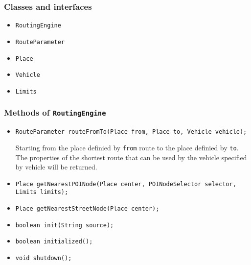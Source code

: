 \subsubsection{Classes and interfaces}

\begin{itemize}

	\item \texttt{RoutingEngine}
	\item \texttt{RouteParameter}
	\item \texttt{Place}
	\item \texttt{Vehicle}
	\item \texttt{Limits}

\end{itemize}

\subsubsection{Methods of \texttt{RoutingEngine}}

\begin{itemize}
	
	\item \texttt{RouteParameter routeFromTo(Place from, Place to, Vehicle vehicle);}\newline
	
	Starting from the place definied by \texttt{from} route to the place definied by \texttt{to}. The properties of the shortest route that can be used by the vehicle specified by vehicle will be returned.
	
	\item \texttt{Place getNearestPOINode(Place center, POINodeSelector selector, Limits limits);}\newline	
	
	\item \texttt{Place getNearestStreetNode(Place center);}\newline
	
	\item \texttt{boolean init(String source);}\newline
	
	\item \texttt{boolean initialized();}\newline
	
	\item \texttt{void shutdown();}\newline	
	

\end{itemize}